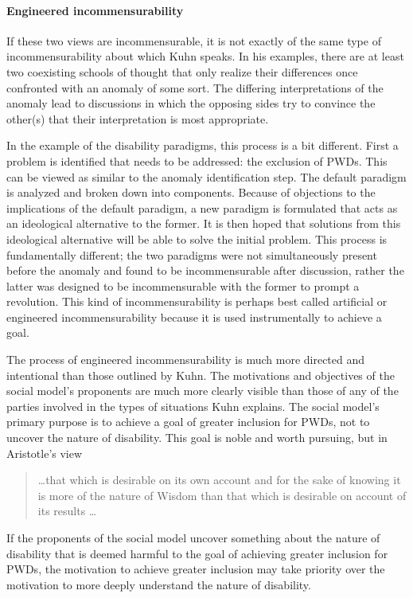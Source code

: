 \documentclass[a4paper]{article}
\begin{document}
\paragraph{Engineered incommensurability}

If these two views are incommensurable, it is not exactly of the same type of
incommensurability about which Kuhn speaks. In his examples, there are at
least two coexisting schools of thought that only realize their differences
once confronted with an anomaly of some sort. The differing interpretations of
the anomaly lead to discussions in which the opposing sides try to convince
the other(s) that their interpretation is most appropriate.

In the example of the disability paradigms, this process is a bit different.
First a problem is identified that needs to be addressed: the exclusion of
PWDs. This can be viewed as similar to the anomaly identification step. The
default paradigm is analyzed and broken down into components. Because of
objections to the implications of the default paradigm, a new paradigm is
formulated that acts as an ideological alternative to the former. It is then
hoped that solutions from this ideological alternative will be able to solve
the initial problem. This process is fundamentally different; the two
paradigms were not simultaneously present before the anomaly and found to be
incommensurable after discussion, rather the latter was designed to be
incommensurable with the former to prompt a revolution. This kind of
incommensurability is perhaps best called artificial or engineered
incommensurability because it is used instrumentally to achieve a goal.

The process of engineered incommensurability is much more directed and
intentional than those outlined by Kuhn. The motivations and objectives of the
social model's proponents are much more clearly visible than those of any of
the parties involved in the types of situations Kuhn explains. The social
model's primary purpose is to achieve a goal of greater inclusion for PWDs,
not to uncover the nature of disability. This goal is noble and worth
pursuing, but in Aristotle's view
%
\begin{quote}
    \ldots that which is desirable on its own account and for the sake of
    knowing it is more of the nature of Wisdom than that which is desirable on
    account of its results \ldots
\end{quote}
%
If the proponents of the social model uncover something about the nature of
disability that is deemed harmful to the goal of achieving greater inclusion
for PWDs, the motivation to achieve greater inclusion may take priority over
the motivation to more deeply understand the nature of disability.
\end{document}
